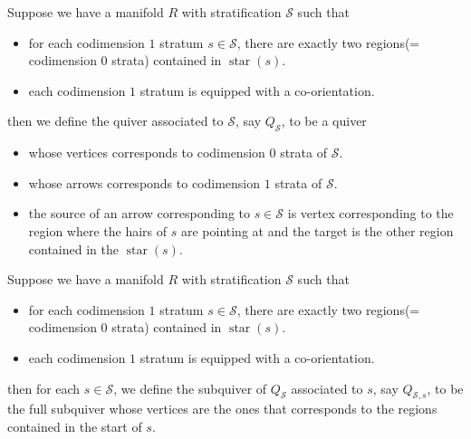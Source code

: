 \begin{definition}
Suppose we have a manifold $R$ with stratification $\mathcal{S}$ such that
\begin{itemize}
\item for each codimension $1$ stratum $s\in \mathcal{S}$, there are exactly two regions(= codimension $0$ strata) contained in $\operatorname{star}(s)$.

\item each codimension $1$ stratum is equipped with a co-orientation.
\end{itemize}
then we define the quiver associated to $\mathcal{S}$, say $Q_{\mathcal{S}}$, to be a quiver
\begin{itemize}
\item whose vertices corresponds to codimension $0$ strata of $\mathcal{S}$.

\item whose arrows corresponds to codimension $1$ strata of $\mathcal{S}$.

\item the source of an arrow corresponding to $s\in \mathcal{S}$ is  vertex corresponding to the region where the hairs of $s$ are pointing at and the target is the other region contained in the $\operatorname{star}(s)$.
\end{itemize}
\end{definition}

\begin{definition}
Suppose we have a manifold $R$ with stratification $\mathcal{S}$ such that
\begin{itemize}
\item for each codimension $1$ stratum $s\in \mathcal{S}$, there are exactly two regions(= codimension $0$ strata) contained in $\operatorname{star}(s)$.

\item each codimension $1$ stratum is equipped with a co-orientation.
\end{itemize}
then for each $s\in \mathcal{S}$, we define the subquiver of $Q_{\mathcal{S}}$ associated to $s$, say $Q_{\mathcal{S},s}$, to be the full subquiver whose vertices are the ones that corresponds to the regions contained in the start of $s$.
\end{definition}

